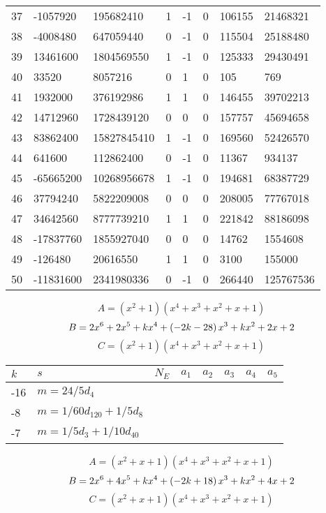 \documentclass{amsart}
\begin{document}
\begin{longtable}{|l|l|l|lllll|}
37&-1057920&195682410&1&-1&0&106155&21468321\\
38&-4008480&647059440&0&-1&0&115504&25188480\\
39&13461600&1804569550&1&-1&0&125333&29430491\\
40&33520&8057216&0&1&0&105&769\\
41&1932000&376192986&1&1&0&146455&39702213\\
42&14712960&1728439120&0&0&0&157757&45694658\\
43&83862400&15827845410&1&-1&0&169560&52426570\\
44&641600&112862400&0&-1&0&11367&934137\\
45&-65665200&10268956678&1&-1&0&194681&68387729\\
46&37794240&5822209008&0&0&0&208005&77767018\\
47&34642560&8777739210&1&1&0&221842&88186098\\
48&-17837760&1855927040&0&0&0&14762&1554608\\
49&-126480&20616550&1&1&0&3100&155000\\
50&-11831600&2341980336&0&-1&0&266440&125767536\\
\hline
\end{longtable}
$$A=(x^2
 + 1)(x^4
 + x^3
 + x^2
 + x
 + 1)$$
$$B=2\*x^6
 + 2\*x^5
 + k\*x^4
 + \left(-2\*k
 - 28\right) \*x^3
 + k\*x^2
 + 2\*x
 + 2$$
$$C=(x^2
 + 1)(x^4
 + x^3
 + x^2
 + x
 + 1)$$
\begin{longtable}{|l|l|l|lllll|}
\hline
$k$ & $s$ & $N_E$ & $a_1$ & $a_2$ & $a_3$ & $a_4$ & $a_5$\\
\hline
-16&$m=24/5d_{4}$&&\multicolumn{5}{c|}{}\\
-8&$m=1/60d_{120}+1/5d_{8}$&&\multicolumn{5}{c|}{}\\
-7&$m=1/5d_{3}+1/10d_{40}$&&\multicolumn{5}{c|}{}\\
\hline
\end{longtable}
$$A=(x^2
 + x
 + 1)(x^4
 + x^3
 + x^2
 + x
 + 1)$$
$$B=2\*x^6
 + 4\*x^5
 + k\*x^4
 + \left(-2\*k
 + 18\right) \*x^3
 + k\*x^2
 + 4\*x
 + 2$$
$$C=(x^2
 + x
 + 1)(x^4
 + x^3
 + x^2
 + x
 + 1)$$
\end{document}
